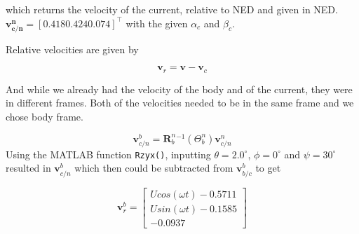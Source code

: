 which returns the velocity of the current, relative to NED and given in NED. $\mathbf{v^n_{c/n}} = [0.418 0.424 0.074]^\top$ with the given $\alpha_c$ and $\beta_c$. 

Relative velocities are given by

\begin{equation}
    \boldsymbol{v}_r = \boldsymbol{v} - \boldsymbol{v}_c
    \label{eq_v_r}
\end{equation}

And while we already had the velocity of the body and of the current, they were in different frames. Both of the velocities needed to be in the same frame and we chose body frame.

\begin{equation}
    \mathbf{v}_{c/n}^b = \mathbf{R}_b^n^{-1}(\Theta^n_b)\mathbf{v}_{c/n}^n
\end{equation}
Using the MATLAB function \texttt{Rzyx()}, inputting $\theta = 2.0^\circ$, $\phi = 0^\circ$ and $\psi = 30^\circ$ resulted in $\mathbf{v}_{c/n}^b$ which then could be subtracted from $\mathbf{v}_{b/c}^b$ to get

\begin{equation}
    \boldsymbol{v}_r^b = 
    \begin{bmatrix}
        U cos(\omega t) - 0.5711 \\
        U sin(\omega t) - 0.1585 \\
        - 0.0937
    \end{bmatrix}
\end{equation}

